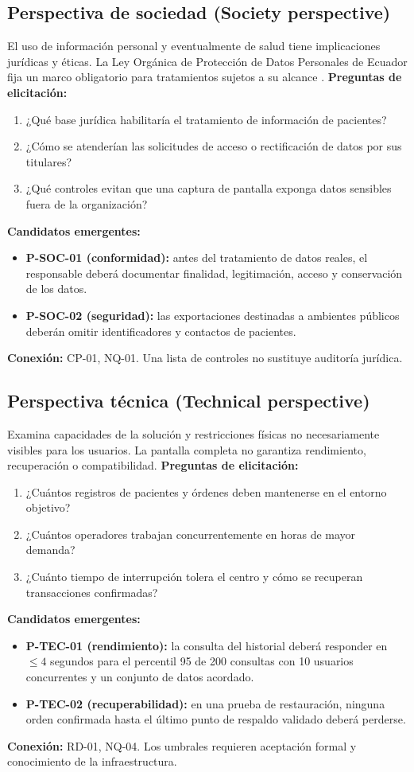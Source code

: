 \subsection{Perspectiva de sociedad (Society perspective)}
El uso de información personal y eventualmente de salud tiene implicaciones jurídicas y éticas. La Ley Orgánica de Protección de Datos Personales de Ecuador fija un marco obligatorio para tratamientos sujetos a su alcance \cite{lopdp2021}.
\textbf{Preguntas de elicitación:}
\begin{enumerate}[label=\alph*)]
\item ¿Qué base jurídica habilitaría el tratamiento de información de pacientes?
\item ¿Cómo se atenderían las solicitudes de acceso o rectificación de datos por sus titulares?
\item ¿Qué controles evitan que una captura de pantalla exponga datos sensibles fuera de la organización?
\end{enumerate}
\textbf{Candidatos emergentes:}
\begin{itemize}
\item \textbf{P-SOC-01 (conformidad):} antes del tratamiento de datos reales, el responsable deberá documentar finalidad, legitimación, acceso y conservación de los datos.
\item \textbf{P-SOC-02 (seguridad):} las exportaciones destinadas a ambientes públicos deberán omitir identificadores y contactos de pacientes.
\end{itemize}
\textbf{Conexión:} CP-01, NQ-01. Una lista de controles no sustituye auditoría jurídica.

\subsection{Perspectiva técnica (Technical perspective)}
Examina capacidades de la solución y restricciones físicas no necesariamente visibles para los usuarios. La pantalla completa no garantiza rendimiento, recuperación o compatibilidad.
\textbf{Preguntas de elicitación:}
\begin{enumerate}[label=\alph*)]
\item ¿Cuántos registros de pacientes y órdenes deben mantenerse en el entorno objetivo?
\item ¿Cuántos operadores trabajan concurrentemente en horas de mayor demanda?
\item ¿Cuánto tiempo de interrupción tolera el centro y cómo se recuperan transacciones confirmadas?
\end{enumerate}
\textbf{Candidatos emergentes:}
\begin{itemize}
\item \textbf{P-TEC-01 (rendimiento):} la consulta del historial deberá responder en $\leq4$ segundos para el percentil 95 de 200 consultas con 10 usuarios concurrentes y un conjunto de datos acordado.
\item \textbf{P-TEC-02 (recuperabilidad):} en una prueba de restauración, ninguna orden confirmada hasta el último punto de respaldo validado deberá perderse.
\end{itemize}
\textbf{Conexión:} RD-01, NQ-04. Los umbrales requieren aceptación formal y conocimiento de la infraestructura.

